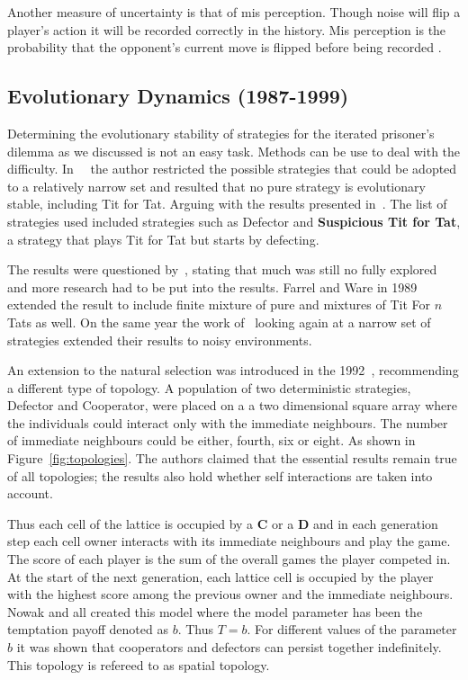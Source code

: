 \documentclass{article}
\begin{document}
Another measure of uncertainty is that of mis perception. Though noise will flip
a player's action it will be recorded correctly in the history. Mis perception is
the probability that the opponent's current move is flipped before being recorded
\cite{Hoffmann1998}.

\subsection{Evolutionary Dynamics (1987-1999)}

Determining the evolutionary stability of strategies for the iterated prisoner's
dilemma as we discussed is not an easy task. Methods can be use to deal with
the difficulty. In~~\cite{Boyd1987} the author restricted the possible strategies
that could be adopted to a relatively narrow set and resulted that no pure strategy
is evolutionary stable, including Tit for Tat. Arguing with the results presented
in~\cite{axelrod1981}. The list of strategies used included strategies such as
Defector and \textbf{Suspicious Tit for Tat}, a strategy that plays
Tit for Tat but starts by defecting.

The results were questioned by~\cite{May1987}, stating that much was still no fully
explored and more research had to be put into the results. Farrel and Ware in
1989~\cite{Farrell1989} extended the result to include finite mixture of pure
and mixtures of Tit For \(n\) Tats as well. On the same year the work of~\cite{Boyd1989}
looking again at a narrow set of strategies extended their results to 
noisy environments.

An extension to the natural selection was introduced in the 1992~\cite{Nowak1992b},
recommending a different type of topology. A population of two deterministic
strategies, Defector and Cooperator, were placed on a a two dimensional square array
where the individuals could interact only with the immediate neighbours.
The number of immediate neighbours could be either, fourth, six or eight. As
shown in Figure~\ref{fig:topologies}. The authors claimed that the essential
results remain true of all topologies; the results also hold whether self interactions
are taken into account.

Thus each cell of the lattice is occupied by a \textbf{C} or a \textbf{D} and in
each generation step each cell owner interacts with its immediate neighbours and
play the game. The score of each player is the sum of the overall games the player
competed in. At the start of the next generation, each lattice cell is occupied by the
player with the highest score among the previous owner and the immediate
neighbours. Nowak and all created this model where the model parameter
has been the temptation payoff denoted as \(b\). Thus \(T=b\). For 
different values of the parameter \(b\) it was shown that cooperators and
defectors can persist together indefinitely. This topology is refereed to as
spatial topology.
\end{document}
